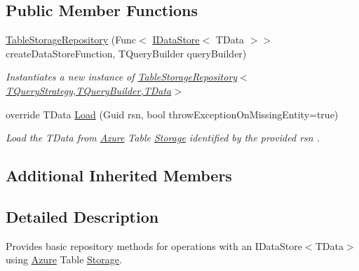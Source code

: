 \subsection*{Public Member Functions}
\begin{DoxyCompactItemize}
\item 
\hyperlink{classCqrs_1_1Azure_1_1BlobStorage_1_1Repositories_1_1TableStorageRepository_a2c98507c1cdd4ed740a8d881a4e779e1_a2c98507c1cdd4ed740a8d881a4e779e1}{Table\+Storage\+Repository} (Func$<$ \hyperlink{interfaceCqrs_1_1DataStores_1_1IDataStore}{I\+Data\+Store}$<$ T\+Data $>$$>$ create\+Data\+Store\+Function, T\+Query\+Builder query\+Builder)
\begin{DoxyCompactList}\small\item\em Instantiates a new instance of \hyperlink{classCqrs_1_1Azure_1_1BlobStorage_1_1Repositories_1_1TableStorageRepository_a2c98507c1cdd4ed740a8d881a4e779e1_a2c98507c1cdd4ed740a8d881a4e779e1}{Table\+Storage\+Repository$<$\+T\+Query\+Strategy,\+T\+Query\+Builder,\+T\+Data$>$} \end{DoxyCompactList}\item 
override T\+Data \hyperlink{classCqrs_1_1Azure_1_1BlobStorage_1_1Repositories_1_1TableStorageRepository_a7238452f19c9d51b5733df7701920605_a7238452f19c9d51b5733df7701920605}{Load} (Guid rsn, bool throw\+Exception\+On\+Missing\+Entity=true)
\begin{DoxyCompactList}\small\item\em Load the {\itshape T\+Data}  from \hyperlink{namespaceCqrs_1_1Azure}{Azure} Table \hyperlink{namespaceCqrs_1_1Azure_1_1Storage}{Storage} identified by the provided {\itshape rsn} . \end{DoxyCompactList}\end{DoxyCompactItemize}
\subsection*{Additional Inherited Members}


\subsection{Detailed Description}
Provides basic repository methods for operations with an I\+Data\+Store$<$\+T\+Data$>$ using \hyperlink{namespaceCqrs_1_1Azure}{Azure} Table \hyperlink{namespaceCqrs_1_1Azure_1_1Storage}{Storage}. 


